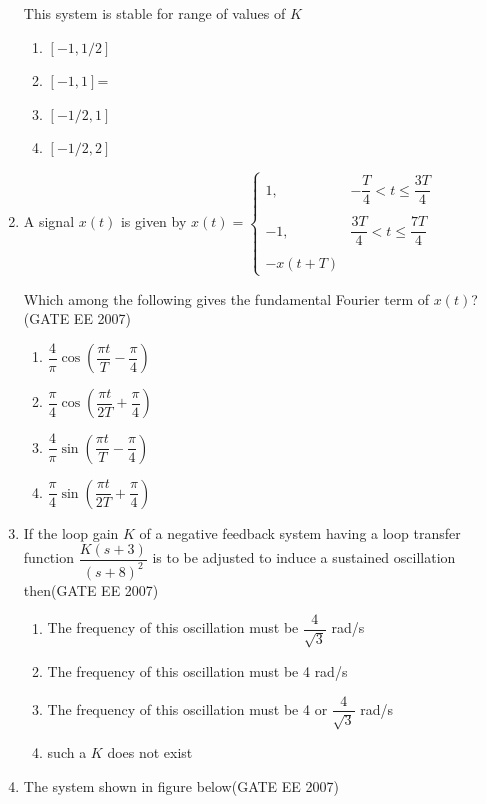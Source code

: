 \documentclass[a4paper,10pt]{exam}
\theoremstyle{remark}
\begin{document}
\begin{enumerate}
\begin{figure}[H]
\end{figure}

This system is stable for range of values of $K$

\begin{multicols}{4}
\begin{enumerate}
\item  $[-1, 1/2]$
\item  $[-1, 1]$=
\item  $[-1/2, 1]$
\item  $[-1/2, 2]$
\end{enumerate}
\end{multicols}

\item A signal $x(t)$ is given by
$
x(t) = \begin{cases} 
1, & -\dfrac{T}{4} < t \leq \dfrac{3T}{4} \\\\ 
-1, & \dfrac{3T}{4} < t \leq \dfrac{7T}{4} \\\\ 
-x(t+T)
\end{cases}
$

Which among the following gives the fundamental Fourier term of $x(t)$?\hfill{(GATE EE 2007)} 

\begin{multicols}{2}
\begin{enumerate}

\item  $\dfrac{4}{\pi} \cos\left(\dfrac{\pi t}{T} - \dfrac{\pi}{4}\right)$

\item  $\dfrac{\pi}{4} \cos\left(\dfrac{\pi t}{2T} + \dfrac{\pi}{4}\right)$

\item  $\dfrac{4}{\pi} \sin\left(\dfrac{\pi t}{T} - \dfrac{\pi}{4}\right)$

\item  $\dfrac{\pi}{4} \sin\left(\dfrac{\pi t}{2T} + \dfrac{\pi}{4}\right)$
\end{enumerate}
\end{multicols}



\item  If the loop gain $K$ of a negative feedback system having a loop transfer function $\dfrac{K(s+3)}{(s+8)^2}$ is to be adjusted to induce a sustained oscillation then\hfill{(GATE EE 2007)} 

\begin{enumerate}
    \item The frequency of this oscillation must be $\dfrac{4}{\sqrt{3}}$ rad/s
    \item The frequency of this oscillation must be 4 rad/s
    \item The frequency of this oscillation must be 4 or $\dfrac{4}{\sqrt{3}}$ rad/s
    \item such a $K$ does not exist
\end{enumerate}
\newpage
\item   The system shown in figure below\hfill{(GATE EE 2007)} 


\end{enumerate}
\end{document}
